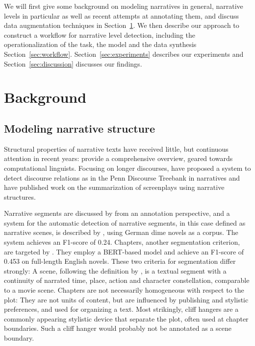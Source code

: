 \documentclass[10pt, a4paper]{article}
\begin{document}
We will first give some background on modeling narratives in general, narrative levels in particular as well as recent attempts at annotating them,  and discuss data augmentation techniques in Section~\ref{sec:background}. We then describe our approach to construct a workflow for narrative level detection, including the operationalization of the task, the model and the data synthesis Section~\ref{sec:workflow}. Section~\ref{sec:experiments} describes our experiments and Section~\ref{sec:discussion} discusses our findings. 

\section{Background}
\label{sec:background}

\subsection{Modeling narrative structure}

Structural properties of narrative texts have received little, but continuous attention in recent years:   provide a comprehensive overview, geared towards computational linguists. Focusing on longer discourses,  have proposed a system to detect discourse relations as in the Penn Discourse Treebank in narratives and  have published work on the summarization of screenplays using narrative structures. 

Narrative segments are discussed by  from an annotation perspective, and a system for the automatic detection of narrative segments, in this case defined as narrative scenes, 
is described by , using German dime novels as a corpus. The system achieves an F1-score of \num{0.24}. Chapters, another segmentation criterion, are targeted by . They employ a BERT-based model and achieve an F1-score of \num{0.453} on full-length English novels. These two criteria for segmentation differ strongly: A scene, following the definition by , is a textual segment with a continuity of narrated time, place, action and character constellation, comparable to a movie scene. Chapters are not necessarily homogeneous with respect to the plot: 
They are not units of content, but are influenced by publishing and stylistic preferences, and used for organizing a text. Most strikingly, cliff hangers are a commonly appearing stylistic device that separate the plot, often used at chapter boundaries. Such a cliff hanger would probably not be annotated as a scene boundary.
\end{document}
